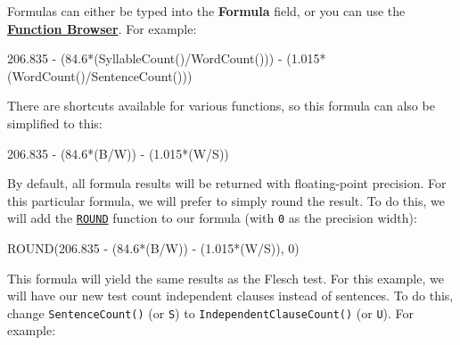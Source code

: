 \documentclass[
]{book}
\newenvironment{Shaded}{\begin{snugshade}}{\end{snugshade}}
\newcommand{\DecValTok}[1]{\textcolor[rgb]{0.00,0.00,0.81}{#1}}
\newcommand{\FloatTok}[1]{\textcolor[rgb]{0.00,0.00,0.81}{#1}}
\newcommand{\FunctionTok}[1]{\textcolor[rgb]{0.00,0.00,0.00}{#1}}
\newcommand{\NormalTok}[1]{#1}
\newcommand{\SpecialCharTok}[1]{\textcolor[rgb]{0.00,0.00,0.00}{#1}}
\theoremstyle{definition}
\theoremstyle{definition}
\theoremstyle{definition}
\theoremstyle{definition}
\theoremstyle{remark}
\begin{document}
Formulas can either be typed into the \textbf{Formula} field, or you can use the \protect\hyperlink{creating-custom-test}{\textbf{Function Browser}}. For example:

\begin{Shaded}
\begin{Highlighting}[]
\FloatTok{206.835} \SpecialCharTok{{-}}\NormalTok{ (}\FloatTok{84.6}\SpecialCharTok{*}\NormalTok{(}\FunctionTok{SyllableCount}\NormalTok{()}\SpecialCharTok{/}\FunctionTok{WordCount}\NormalTok{())) }\SpecialCharTok{{-}}  
\NormalTok{    (}\FloatTok{1.015}\SpecialCharTok{*}\NormalTok{(}\FunctionTok{WordCount}\NormalTok{()}\SpecialCharTok{/}\FunctionTok{SentenceCount}\NormalTok{()))}
\end{Highlighting}
\end{Shaded}

There are shortcuts available for various functions, so this formula can also be simplified to this:

\begin{Shaded}
\begin{Highlighting}[]
\FloatTok{206.835} \SpecialCharTok{{-}}\NormalTok{ (}\FloatTok{84.6}\SpecialCharTok{*}\NormalTok{(B}\SpecialCharTok{/}\NormalTok{W)) }\SpecialCharTok{{-}}\NormalTok{ (}\FloatTok{1.015}\SpecialCharTok{*}\NormalTok{(W}\SpecialCharTok{/}\NormalTok{S))}
\end{Highlighting}
\end{Shaded}

By default, all formula results will be returned with floating-point precision. For this particular formula, we will prefer to simply round the result. To do this, we will add the \protect\hyperlink{custom-test-functions}{\texttt{ROUND}} function to our formula (with \texttt{0} as the precision width):

\begin{Shaded}
\begin{Highlighting}[]
\FunctionTok{ROUND}\NormalTok{(}\FloatTok{206.835} \SpecialCharTok{{-}}\NormalTok{ (}\FloatTok{84.6}\SpecialCharTok{*}\NormalTok{(B}\SpecialCharTok{/}\NormalTok{W)) }\SpecialCharTok{{-}}\NormalTok{ (}\FloatTok{1.015}\SpecialCharTok{*}\NormalTok{(W}\SpecialCharTok{/}\NormalTok{S)), }\DecValTok{0}\NormalTok{)}
\end{Highlighting}
\end{Shaded}

This formula will yield the same results as the Flesch test. For this example, we will have our new test count independent clauses instead of sentences. To do this, change \texttt{SentenceCount()} (or \texttt{S}) to \texttt{IndependentClauseCount()} (or \texttt{U}). For example:
\end{document}
